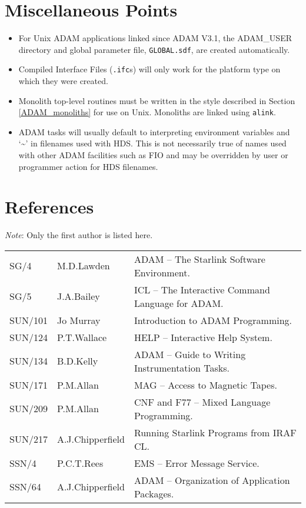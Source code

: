 \documentclass[twoside,11pt,nolof]{starlink}
\begin{document}
\section{Miscellaneous Points}
\begin{itemize}
\item For Unix ADAM applications linked since ADAM V3.1, the ADAM\_USER
directory and global parameter file, \texttt{GLOBAL.sdf}, are created
automatically.
\item Compiled Interface Files (\texttt{.ifc}s) will only work for the platform
type on which they were created.
\item Monolith top-level routines must be written in the style described
in Section \ref{ADAM_monoliths} for use on Unix.
Monoliths are linked using \texttt{alink}.
\item ADAM tasks will usually default to interpreting environment variables
and `\~{}' in filenames used with HDS. This is not necessarily true of
names used with other ADAM facilities such as FIO and may be overridden by
user or programmer action for HDS filenames.
\end{itemize}

\section{References}
\emph{Note}: Only the first author is listed here.

\begin{latexonly}
\begin{tabular}{lll}
SG/4 & M.D.Lawden & ADAM -- The Starlink Software Environment.\\
SG/5 & J.A.Bailey & ICL -- The Interactive Command Language for ADAM.\\
SUN/101 & Jo Murray & Introduction to ADAM Programming.\\
SUN/124 & P.T.Wallace & HELP -- Interactive Help System.\\
SUN/134 & B.D.Kelly & ADAM -- Guide to Writing Instrumentation Tasks.\\
SUN/171 & P.M.Allan & MAG -- Access to Magnetic Tapes.\\
SUN/209 & P.M.Allan & CNF and F77 -- Mixed Language Programming.\\
SUN/217 & A.J.Chipperfield & Running Starlink Programs from IRAF CL.\\
SSN/4 & P.C.T.Rees  &EMS -- Error Message Service.\\
SSN/64 & A.J.Chipperfield & ADAM -- Organization of Application Packages.
\end{tabular}
\end{latexonly}
\end{document}
